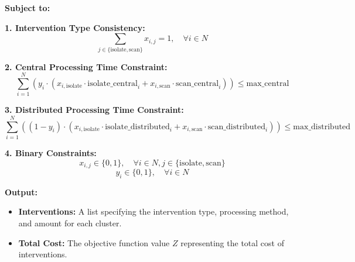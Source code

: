 \documentclass{article}
\begin{document}
\textbf{Subject to:}

\textbf{1. Intervention Type Consistency:}
\[
\sum_{j \in \{ \text{isolate}, \text{scan} \}} x_{i,j} = 1, \quad \forall i \in N
\]

\textbf{2. Central Processing Time Constraint:}
\[
\sum_{i=1}^{N} (y_i \cdot (x_{i,\text{isolate}} \cdot \text{isolate\_central}_i + x_{i,\text{scan}} \cdot \text{scan\_central}_i)) \leq \text{max\_central}
\]

\textbf{3. Distributed Processing Time Constraint:}
\[
\sum_{i=1}^{N} ((1 - y_i) \cdot (x_{i,\text{isolate}} \cdot \text{isolate\_distributed}_i + x_{i,\text{scan}} \cdot \text{scan\_distributed}_i)) \leq \text{max\_distributed}
\]

\textbf{4. Binary Constraints:}
\[
x_{i,j} \in \{0, 1\}, \quad \forall i \in N, j \in \{ \text{isolate}, \text{scan} \}
\]
\[
y_i \in \{0, 1\}, \quad \forall i \in N
\]

\textbf{Output:}
\begin{itemize}
    \item \textbf{Interventions:} A list specifying the intervention type, processing method, and amount for each cluster.
    \item \textbf{Total Cost:} The objective function value \( Z \) representing the total cost of interventions.
\end{itemize}
\end{document}
